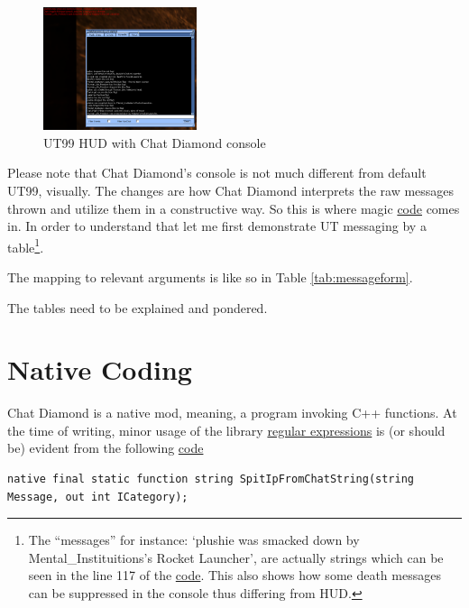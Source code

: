 \documentclass{article}
\theoremstyle{definition}
\begin{document}
\begin{figure}
\centering
\includegraphics[width=0.4\textwidth]{consoleundhud}
\caption{UT99 HUD with Chat Diamond console}
\label{fig:chatdiamond_console_hud}
\end{figure}

Please note that Chat Diamond's console is not much different from default UT99, visually.  The changes are how Chat Diamond interprets the raw messages thrown and utilize them in a constructive way. So this is where magic \href{https://github.com/ravimohan1991/ChatDiamond/blob/859323fbd80266b21c9dab163b067cacfa318463/Classes/CDUTConsole.uc#L52-L71}{code} comes in.  In order to understand that let me first demonstrate UT messaging by a table\footnote{\label{foot:hudconsolediff} The ``messages'' for instance: `plushie was smacked down by Mental\_Instituitions's Rocket Launcher', are actually strings which can be seen in the line 117 of the \href{http://uncodex.ut-files.com/UT/v436/Source_botpack/deathmessageplus.html}{code}.  This also shows how some death messages can be suppressed in the console thus differing from HUD.}.

The mapping to relevant arguments is like so in Table \ref{tab:messageform}.


The tables need to be explained and pondered.

\section{Native Coding}
Chat Diamond is a native mod, meaning, a program invoking C++ functions.  At the time of writing, minor usage of the library 
\href{https://en.cppreference.com/w/cpp/regex}{regular expressions} is (or should be) evident from the following \href{https://github.com/ravimohan1991/ChatDiamond/blob/6e3b684403fb75811c1cde6372c9125370bc796a/Classes/CDDiscordActor.uc#L61}{code}

\begin{lstlisting}[frame=single]
native final static function string SpitIpFromChatString(string Message, out int ICategory);
\end{lstlisting}
\end{document}
